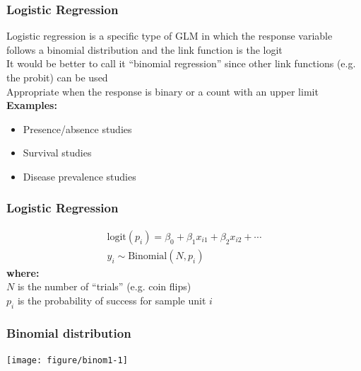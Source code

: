 \documentclass[color=usenames,dvipsnames]{beamer}\usepackage[]{graphicx}\usepackage[]{color}
\newenvironment{knitrout}{}{} %
\begin{document}
\begin{frame}
  \frametitle{Logistic Regression}
  Logistic regression is a specific type of GLM in which the
      response variable follows a binomial distribution and the link
      function is the logit \\
  \pause
  \vfill
  It would be better to call it ``binomial regression'' since other
      link functions (e.g. the probit) can be used \\
  \pause
  \vfill
  Appropriate when the response is binary or a count with an
  upper limit
  \pause
  \vfill
  {\bf Examples:}
      \begin{itemize}
        \normalsize
        \item Presence/absence studies
        \item Survival studies
        \item Disease prevalence studies
      \end{itemize}
\end{frame}







\begin{frame}
  \frametitle{Logistic Regression}
    \begin{gather*}
      \mathrm{logit}(p_i) = \beta_0 + \beta_1 x_{i1} + \beta_2 x_{i2} + \cdots \\
      y_i \sim \mathrm{Binomial}(N, p_i)
  \end{gather*}
  \pause
  {\bf where: \\}
  $N$ is the number of ``trials'' (e.g. coin flips) \\
  $p_i$ is the probability of success for sample unit $i$
\end{frame}



\begin{frame}[fragile]
  \frametitle{Binomial distribution}%
  \vspace{-0.4cm}
\begin{center}
\begin{knitrout}
\color{fgcolor}
\texttt{[image: figure/binom1-1]} 
\end{knitrout}
\end{center}
\vfill
\end{frame}
\end{document}

